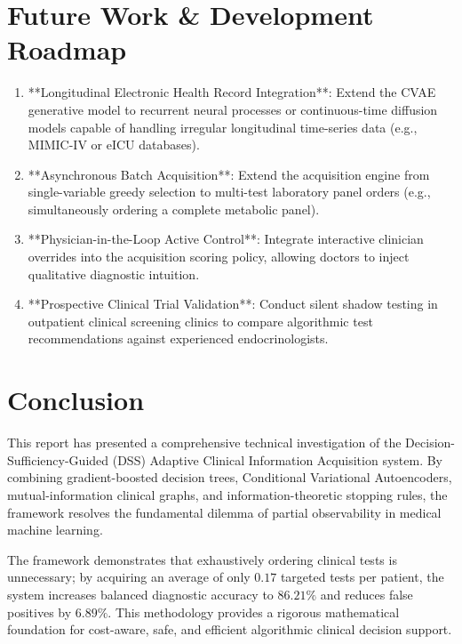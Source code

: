 \documentclass[11pt,a4paper]{report}
\begin{document}
\chapter{Future Work \& Development Roadmap}

\begin{enumerate}[label=\textbf{\arabic*.}]
  \item **Longitudinal Electronic Health Record Integration**: Extend the CVAE generative model to recurrent neural processes or continuous-time diffusion models capable of handling irregular longitudinal time-series data (e.g., MIMIC-IV or eICU databases).
  \item **Asynchronous Batch Acquisition**: Extend the acquisition engine from single-variable greedy selection to multi-test laboratory panel orders (e.g., simultaneously ordering a complete metabolic panel).
  \item **Physician-in-the-Loop Active Control**: Integrate interactive clinician overrides into the acquisition scoring policy, allowing doctors to inject qualitative diagnostic intuition.
  \item **Prospective Clinical Trial Validation**: Conduct silent shadow testing in outpatient clinical screening clinics to compare algorithmic test recommendations against experienced endocrinologists.
\end{enumerate}

\chapter{Conclusion}
This report has presented a comprehensive technical investigation of the Decision-Sufficiency-Guided (DSS) Adaptive Clinical Information Acquisition system. By combining gradient-boosted decision trees, Conditional Variational Autoencoders, mutual-information clinical graphs, and information-theoretic stopping rules, the framework resolves the fundamental dilemma of partial observability in medical machine learning.

The framework demonstrates that exhaustively ordering clinical tests is unnecessary; by acquiring an average of only $0.17$ targeted tests per patient, the system increases balanced diagnostic accuracy to $86.21\%$ and reduces false positives by $6.89\%$. This methodology provides a rigorous mathematical foundation for cost-aware, safe, and efficient algorithmic clinical decision support.
\end{document}
